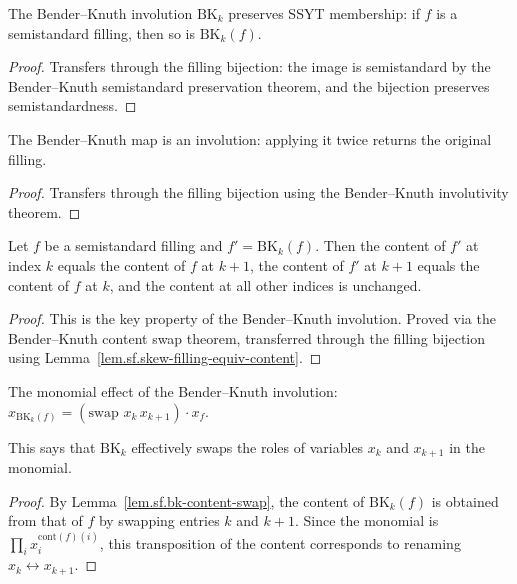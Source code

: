 \begin{lemma}
\label{lem.sf.bk-mem}
\leanhelper
\leanok
The Bender--Knuth involution $\mathrm{BK}_k$ preserves SSYT membership:
if $f$ is a semistandard filling, then so is $\mathrm{BK}_k(f)$.
\end{lemma}

\begin{proof}
\leanok
Transfers through the filling bijection: the image is semistandard
by the Bender--Knuth semistandard preservation theorem,
and the bijection preserves semistandardness.
\end{proof}

\begin{lemma}
\label{lem.sf.bk-invol}
\leanhelper
\leanok
The Bender--Knuth map is an involution: applying it twice returns the
original filling.
\end{lemma}

\begin{proof}
\leanok
Transfers through the filling bijection using
the Bender--Knuth involutivity theorem.
\end{proof}

\begin{lemma}
\label{lem.sf.bk-content-swap}
\leanhelper
\leanok
Let $f$ be a semistandard filling and $f' = \mathrm{BK}_k(f)$.
Then the content of $f'$ at index $k$ equals the content of $f$ at $k{+}1$,
the content of $f'$ at $k{+}1$ equals the content of $f$ at $k$,
and the content at all other indices is unchanged.
\end{lemma}

\begin{proof}
\leanok
This is the key property of the Bender--Knuth involution.
Proved via the Bender--Knuth content swap theorem,
transferred through the filling bijection using
Lemma~\ref{lem.sf.skew-filling-equiv-content}.
\end{proof}

\begin{lemma}
\label{lem.sf.bk-mono}
\leanhelper
\leanok
The monomial effect of the Bender--Knuth involution:
$x_{\mathrm{BK}_k(f)} = (\text{swap } x_k\, x_{k+1}) \cdot x_f$.

This says that $\mathrm{BK}_k$ effectively swaps the roles of variables $x_k$
and $x_{k+1}$ in the monomial.
\end{lemma}

\begin{proof}
By Lemma~\ref{lem.sf.bk-content-swap}, the content of $\mathrm{BK}_k(f)$ is
obtained from that of $f$ by swapping entries $k$ and $k{+}1$.
Since the monomial is $\prod_i x_i^{\mathrm{cont}(f)(i)}$,
this transposition of the content corresponds to renaming $x_k \leftrightarrow x_{k+1}$.
\end{proof}

